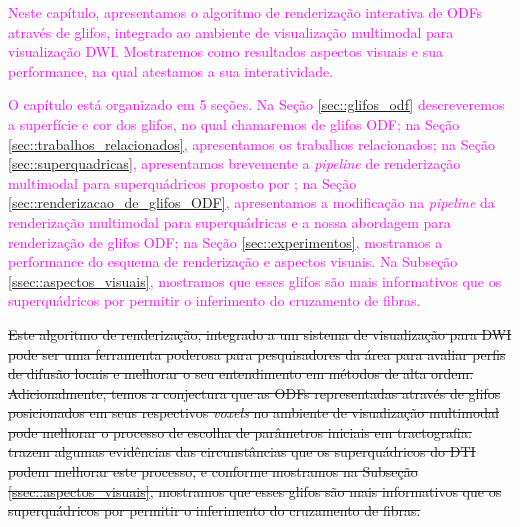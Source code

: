 \documentclass[
    12pt,                %
    oneside,            %
    a4paper,            %
    english,            %
    french,                %
    spanish,            %
    brazil                %
    ]{abntex2}
\begin{document}

\textcolor{magenta}{
Neste capítulo, apresentamos o algoritmo de renderização interativa de ODFs através de glifos, integrado ao ambiente de visualização multimodal para visualização DWI. Mostraremos como resultados aspectos visuais e sua performance, na qual atestamos a sua interatividade.
}

\textcolor{magenta}{O capítulo está organizado em 5 seções. Na Seção \ref{sec::glifos_odf} descreveremos a superfície e cor dos glifos, no qual chamaremos de glifos ODF; na Seção \ref{sec::trabalhos_relacionados}, apresentamos os trabalhos relacionados; na Seção \ref{sec::superquadricas}, apresentamos brevemente a \textit{pipeline} de renderização multimodal para superquádricos proposto por ; na Seção \ref{sec::renderizacao_de_glifos_ODF}, apresentamos a modificação na \textit{pipeline} da renderização multimodal para superquádricas e a nossa abordagem para renderização de glifos ODF; na Seção \ref{sec::experimentos}, mostramos a performance do esquema de renderização e aspectos visuais.
}
\textcolor{magenta}{
Na Subseção \ref{ssec::aspectos_visuais}, mostramos que esses glifos são mais informativos que os superquádricos por permitir o inferimento do cruzamento de fibras.
}

\sout{Este algoritmo de renderização, integrado a um sistema de visualização para DWI pode ser uma ferramenta poderosa para pesquisadores da área para avaliar perfis de difusão locais e melhorar o seu entendimento em métodos de alta ordem.
Adicionalmente, temos a conjectura que as ODFs representadas através de glifos posicionados em seus respectivos \textit{voxels} no ambiente de visualização multimodal pode melhorar o processo de escolha de parâmetros iniciais em tractografia.  trazem algumas evidências das circunstâncias que os superquádricos do DTI podem melhorar este processo, e conforme mostramos na Subseção \ref{ssec::aspectos_visuais}, mostramos que esses glifos são mais informativos que os superquádricos por permitir o inferimento do cruzamento de fibras.
}
\end{document}
